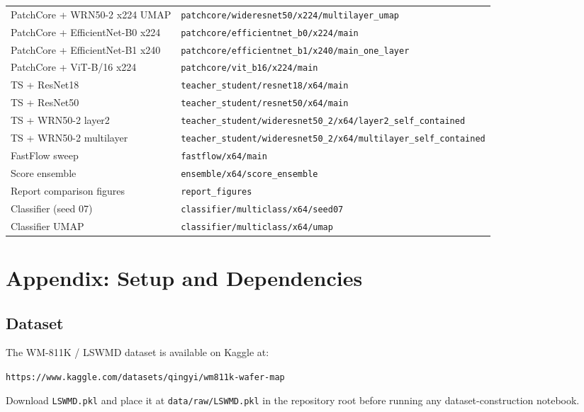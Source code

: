 \documentclass[11pt]{article}
\begin{document}
\begin{table}[H]
\begin{tabularx}{\linewidth}{>{\raggedright\arraybackslash}X>{\raggedright\arraybackslash}X}
PatchCore + WRN50-2 x224 UMAP
  & \texttt{patchcore/wideresnet50/x224/multilayer\_umap} \\
PatchCore + EfficientNet-B0 x224
  & \texttt{patchcore/efficientnet\_b0/x224/main} \\
PatchCore + EfficientNet-B1 x240
  & \texttt{patchcore/efficientnet\_b1/x240/main\_one\_layer} \\
PatchCore + ViT-B/16 x224
  & \texttt{patchcore/vit\_b16/x224/main} \\
TS + ResNet18
  & \texttt{teacher\_student/resnet18/x64/main} \\
TS + ResNet50
  & \texttt{teacher\_student/resnet50/x64/main} \\
TS + WRN50-2 layer2
  & \texttt{teacher\_student/wideresnet50\_2/}\newline\texttt{x64/layer2\_self\_contained} \\
TS + WRN50-2 multilayer
  & \texttt{teacher\_student/wideresnet50\_2/}\newline\texttt{x64/multilayer\_self\_contained} \\
FastFlow sweep
  & \texttt{fastflow/x64/main} \\
Score ensemble
  & \texttt{ensemble/x64/score\_ensemble} \\
Report comparison figures
  & \texttt{report\_figures} \\
Classifier (seed 07)
  & \texttt{classifier/multiclass/x64/seed07} \\
Classifier UMAP
  & \texttt{classifier/multiclass/x64/umap} \\
\bottomrule
\end{tabularx}
\end{table}

\newpage
\section{Appendix: Setup and Dependencies}
\label{app:setup}

\subsection{Dataset}

The WM-811K / LSWMD dataset is available on Kaggle at:
\begin{center}
\texttt{https://www.kaggle.com/datasets/qingyi/wm811k-wafer-map}
\end{center}
Download \texttt{LSWMD.pkl} and place it at \texttt{data/raw/LSWMD.pkl} in the repository root before running any dataset-construction notebook.
\end{document}
